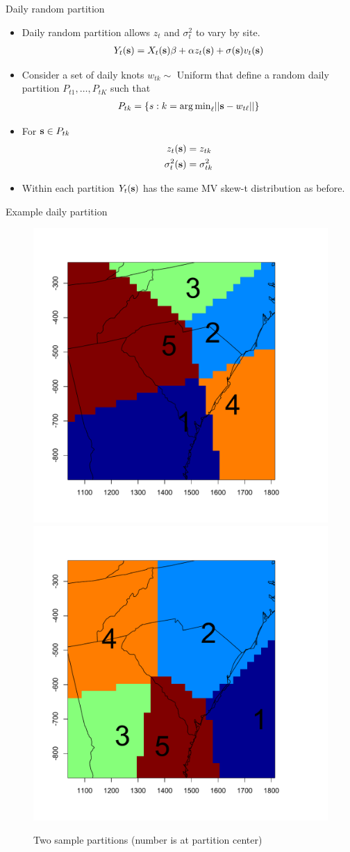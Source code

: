 \documentclass{beamer}
\begin{document}
\begin{frame}{Daily random partition}
  \begin{itemize} \setlength{\itemsep}{0.5em}
    \item Daily random partition allows $z_t$ and $\sigma^2_t$ to vary by site.
    \begin{align*}
      Y_t(\mbox{\bf s}) = X_t(\mbox{\bf s}) \beta + \alpha z_t(\mbox{\bf s}) + \sigma(\mbox{\bf s}) v_t(\mbox{\bf s})
    \end{align*}
    \item Consider a set of daily knots $w_{tk} \sim$ Uniform that define a random daily partition
    $P_{t1}, \ldots, P_{tK}$ such that
    \begin{align*}
      P_{tk} = \{s : k = {\mathop{\rm arg\, min}}_\ell|| \mbox{\bf s} - w_{t\ell}|| \}
    \end{align*}
    \item For $\mbox{\bf s} \in P_{tk}$
    \begin{align*}
      z_t(\mbox{\bf s}) &= z_{tk}\\
      \sigma^2_t(\mbox{\bf s}) &= \sigma^2_{tk}
    \end{align*}
    \item Within each partition $Y_t(\mbox{\bf s})$ has the same MV skew-t distribution as before.
  \end{itemize}
\end{frame}

\begin{frame}{Example daily partition}
    \centering
    \begin{figure}
    \includegraphics[width=0.54\linewidth]{./plots/example-partition-1.pdf}
    \includegraphics[width=0.54\linewidth]{./plots/example-partition-2.pdf}
    \caption{Two sample partitions (number is at partition center)}
    \end{figure}
\end{frame}
\end{document}
